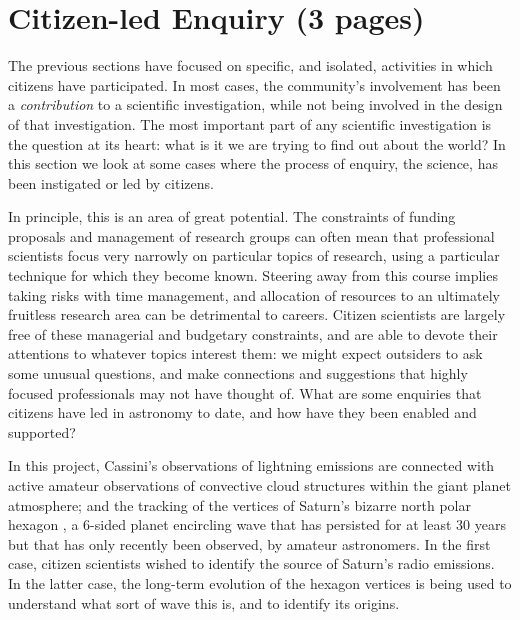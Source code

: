 \documentclass{ar2e}
\begin{document}
% 
% 
% 
% 

\section{Citizen-led Enquiry (3 pages)}
\label{sec:explore}

The previous sections have focused on specific, and isolated, activities in
which citizens have participated. In most cases, the community's involvement has
been a {\it contribution} to a scientific investigation, while not being
involved in the design of that investigation. The most important part of any
scientific investigation is the question at its heart: what is it we are
trying to find out about the world? In this section we look at some cases where
the process of enquiry, the science, has been instigated or led by citizens.  

In principle, this is an area of great potential. The constraints of funding
proposals and management of research groups can often mean that professional
scientists focus very narrowly on particular topics of research, using a
particular technique for which they become known.  Steering away from this
course implies taking risks with time management, and allocation of resources to
an ultimately fruitless research area can be detrimental to careers.  Citizen
scientists are largely free of these managerial and budgetary constraints, and
are able to devote their attentions to whatever topics interest them: we might
expect outsiders to ask some unusual questions, and make connections and
suggestions that highly focused professionals may not have thought of. What are
some enquiries that citizens have led in astronomy to date, and how have they
been enabled and supported?


In this project, Cassini's observations of lightning emissions are connected
with active amateur observations of convective cloud structures within the giant
planet atmosphere; and the tracking of the vertices of Saturn's bizarre north
polar hexagon \citep{88godfrey}, a 6-sided planet encircling wave that has
persisted for at least 30 years but that has only recently been observed, by
amateur astronomers.  In the first case, citizen scientists wished to identify
the source of Saturn's radio emissions.  In the latter case, the long-term
evolution of the hexagon vertices is being used to understand what sort of wave
this is, and to identify its origins.
\end{document}
